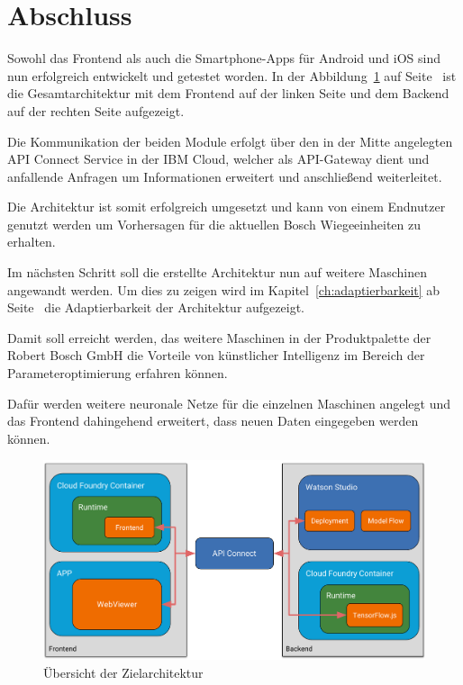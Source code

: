 \section{Abschluss}
Sowohl das Frontend als auch die Smartphone-Apps für Android und iOS sind nun erfolgreich entwickelt und getestet worden.
In der Abbildung~\ref{fig:umsetzung_zielarchitektur_4} auf Seite~\pageref{fig:umsetzung_zielarchitektur_4} ist die
Gesamtarchitektur mit dem Frontend auf der linken Seite und dem Backend auf der rechten Seite aufgezeigt.

Die Kommunikation der beiden Module erfolgt über den in der Mitte angelegten API Connect Service in der IBM Cloud,
welcher als API-Gateway dient und anfallende Anfragen um Informationen erweitert und anschließend weiterleitet.

Die Architektur ist somit erfolgreich umgesetzt und kann von einem Endnutzer genutzt werden um Vorhersagen für die
aktuellen Bosch Wiegeeinheiten zu erhalten.

Im nächsten Schritt soll die erstellte Architektur nun auf weitere Maschinen angewandt werden. Um dies zu zeigen wird
im Kapitel~\ref{ch:adaptierbarkeit} ab Seite~\pageref{ch:adaptierbarkeit} die Adaptierbarkeit der Architektur aufgezeigt.

Damit soll erreicht werden, das weitere Maschinen in der Produktpalette der Robert Bosch GmbH die Vorteile von
künstlicher Intelligenz im Bereich der Parameteroptimierung erfahren können.

Dafür werden weitere neuronale Netze für die einzelnen Maschinen angelegt und das Frontend dahingehend erweitert,
dass neuen Daten eingegeben werden können.

\begin{figure}[h]
    \centering
    \includegraphics[width=\textwidth]{images/kapitel_4/architektur_uebersicht.pdf}
    \caption{Übersicht der Zielarchitektur}
    \label{fig:umsetzung_zielarchitektur_4}
\end{figure}